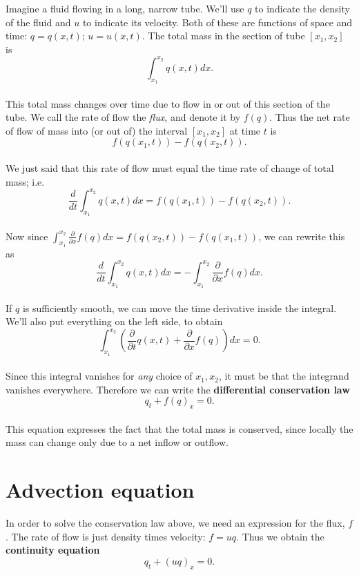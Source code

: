 \documentclass{SIAMbook2016}
\begin{document}
Imagine a fluid flowing in a long, narrow tube. We'll use \(q\) to
indicate the density of the fluid and \(u\) to indicate its velocity.
Both of these are functions of space and time: \(q = q(x,t)\);
\(u=u(x,t)\). The total mass in the section of tube \([x_1,x_2]\) is\\
\begin{equation*}
\int_{x_1}^{x_2} q(x,t) dx.
\end{equation*}\\
This total mass changes over time due to flow in or out of this section
of the tube. We call the rate of flow the \emph{flux}, and denote it by
\(f(q)\). Thus the net rate of flow of mass into (or out of) the
interval \([x_1,x_2]\) at time \(t\) is\\
\[f(q(x_1,t)) - f(q(x_2,t)).\]\\
We just said that this rate of flow must equal the time rate of change
of total mass; i.e.\\
\[\frac{d}{dt} \int_{x_1}^{x_2} q(x,t) dx = f(q(x_1,t)) - f(q(x_2,t)).\]\\
Now since
\(\int_{x_1}^{x_2} \frac{\partial}{\partial x} f(q) dx = f(q(x_2,t)) - f(q(x_1,t))\),
we can rewrite this as\\
\[\frac{d}{dt} \int_{x_1}^{x_2} q(x,t) dx = -\int_{x_1}^{x_2} \frac{\partial}{\partial x} f(q) dx.\]\\
If \(q\) is sufficiently smooth, we can move the time derivative inside
the integral. We'll also put everything on the left side, to obtain\\
\[\int_{x_1}^{x_2} \left(\frac{\partial}{\partial t}q(x,t) + \frac{\partial}{\partial x} f(q)\right) dx = 0.\]\\
Since this integral vanishes for \emph{any} choice of \(x_1,x_2\), it
must be that the integrand vanishes everywhere. Therefore we can write
the \textbf{differential conservation law}\\
\[q_t + f(q)_x = 0.\]\\
This equation expresses the fact that the total mass is conserved, since
locally the mass can change only due to a net inflow or outflow.

\hypertarget{advection}{%
\section{Advection equation}\label{advection-equation}}

In order to solve the conservation law above, we need an expression for
the flux, \(f\). The rate of flow is just density times velocity:
\(f=u q\). Thus we obtain the \textbf{continuity equation}\\
\[q_t + (uq)_x = 0.\]
\end{document}
